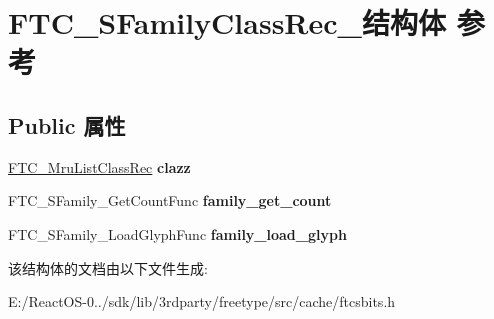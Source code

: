\hypertarget{struct_f_t_c___s_family_class_rec__}{}\section{F\+T\+C\+\_\+\+S\+Family\+Class\+Rec\+\_\+结构体 参考}
\label{struct_f_t_c___s_family_class_rec__}
\subsection*{Public 属性}
\begin{DoxyCompactItemize}
\item 
\mbox{\label{struct_f_t_c___s_family_class_rec___af7d295d715e5f9f3b547be44f0e3f90b}} 
\hyperlink{struct_f_t_c___mru_list_class_rec__}{F\+T\+C\+\_\+\+Mru\+List\+Class\+Rec} {\bfseries clazz}
\item 
\mbox{\label{struct_f_t_c___s_family_class_rec___a57fc1e09cc711845085cb92c1d501906}} 
F\+T\+C\+\_\+\+S\+Family\+\_\+\+Get\+Count\+Func {\bfseries family\+\_\+get\+\_\+count}
\item 
\mbox{\label{struct_f_t_c___s_family_class_rec___a98a017fde579be6a9cbf27c8e1febf34}} 
F\+T\+C\+\_\+\+S\+Family\+\_\+\+Load\+Glyph\+Func {\bfseries family\+\_\+load\+\_\+glyph}
\end{DoxyCompactItemize}


该结构体的文档由以下文件生成\+:\begin{DoxyCompactItemize}
\item 
E\+:/\+React\+O\+S-\/0../sdk/lib/3rdparty/freetype/src/cache/ftcsbits.\+h\end{DoxyCompactItemize}
